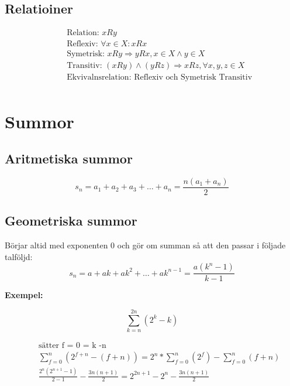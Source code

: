 \subsection{Relatioiner}
\begin{align*}
  &\quad  \text{Relation: } xRy \\
  &\quad  \text{Reflexiv: } \forall x \in X: xRx \\
  &\quad  \text{Symetrisk: } xRy \Rightarrow yRx, x \in X \land y \in X \\
  &\quad  \text{Transitiv: } (xRy) \land (yRz) \Rightarrow xRz, \forall x,y,z \in X  \\
  &\quad  \text{Ekvivalnsrelation: Reflexiv och Symetrisk Transitiv} \\
\end{align*}


\newpage

\section{Summor}
\subsection{Aritmetiska summor}
\begin{equation}
s _ { n } = a _ { 1 } + a _ { 2 } + a _ { 3 } + \ldots + a _ { n } = \frac { n \left( a _ { 1 } + a _ { n } \right) } { 2 }
\end{equation}


\subsection{Geometriska summor}
Börjar altid med exponenten 0 och gör om summan så att den passar i följade talföljd:
\begin{equation}
s _ { n } = a + a k + a k ^ { 2 } + \ldots + a k ^ { n - 1 } = \frac { a \left( k ^ { n } - 1 \right) } { k - 1 }
\end{equation}


\textbf{Exempel:}\par
\begin{equation}
\displaystyle\sum _ { k = n } ^ { 2n } (2^{k} - k)
\end{equation}

\begin{align*}
  &\quad \text{sätter f = 0 = k -n} \\
  &\quad \displaystyle\sum _ { f = 0 } ^ { n } (2^{f+n} - (f+n)) = 2^{n} * \displaystyle\sum _ { f = 0 } ^ { n } (2^{f}) - \displaystyle\sum _ { f = 0 } ^ { n } (f+n) \\
  &\quad \frac{2^{n} (2^{n+1} -1)}{2-1} - \frac{3n(n+1)}{2} = 2^{2n+1} - 2^{n} - \frac{3n(n+1)}{2}\\
  &\quad  \\
\end{align*}


